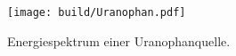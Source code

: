 \begin{figure}[H]
    \centering
    \texttt{[image: build/Uranophan.pdf]}
    \caption{Energiespektrum einer Uranophanquelle.}
    \label{fig:Uranophan}
\end{figure}




